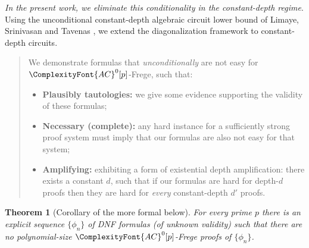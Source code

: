 \documentclass[11pt,letter]{article}
\newtheorem{theorem}{Theorem}[section]
\theoremstyle{remark} %
\newcommand{\ACZ}{\ensuremath{\ComplexityFont{AC}^0}}
\newcommand{\ACZP}{\ensuremath{\ACZ[p]}}
\begin{document}
\emph{In the present work, we eliminate this conditionality in the constant-depth regime}. Using the unconditional constant-depth algebraic circuit lower bound of Limaye, Srinivasan and Tavenas \cite{LST25}, we extend the diagonalization framework to constant-depth circuits.
\begin{quote}
We demonstrate formulas that \textit{unconditionally} are not easy for $\ACZ[p]$-Frege, such that:  
\begin{itemize}
    \item \textbf{Plausibly tautologies:} we give some evidence supporting the validity of these formulas;

    \item \textbf{Necessary (complete):} any hard instance for a sufficiently strong proof system must imply that our formulas are also not easy for that system;

    \item \textbf{Amplifying:} exhibiting a form of existential depth amplification: there exists a constant $d$, such that if our formulas are hard for depth-$d$ proofs then they are hard for \emph{every} constant-depth $d'$ proofs.  
\end{itemize}
\end{quote}

 
\begin{theorem} [Corollary of the more formal  below] \label{thm:mainthm1}
    For every prime $p$ there is an explicit sequence $\{\phi_n\}$ of DNF formulas (of unknown validity) such that there are no polynomial-size \ACZP-Frege proofs of $\{\phi_n\}$.
\end{theorem}








\end{document}
